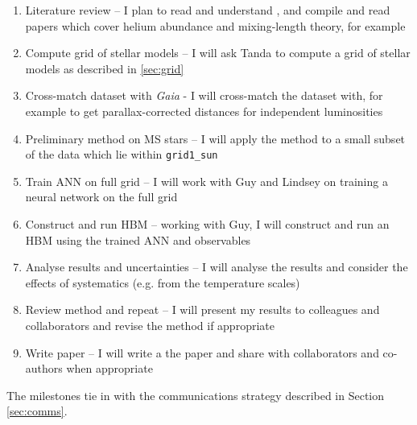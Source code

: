 \documentclass[twocolumn]{aastex63}
\begin{document}
\begin{enumerate}
    \item Literature review -- I plan to read and understand , and compile and read papers which cover helium abundance and mixing-length theory, for example
    \item Compute grid of stellar models -- I will ask Tanda to compute a grid of stellar models as described in \ref{sec:grid}
    \item Cross-match dataset with \textit{Gaia} - I will cross-match the dataset with, for example \citet{Berger.Huber.ea2018} to get parallax-corrected distances for independent luminosities
    \item Preliminary method on MS stars -- I will apply the method to a small subset of the data which lie within \texttt{grid1\_sun}
    \item Train ANN on full grid -- I will work with Guy and Lindsey on training a neural network on the full grid
    \item Construct and run HBM -- working with Guy, I will construct and run an HBM using the trained ANN and observables
    \item Analyse results and uncertainties -- I will analyse the results and consider the effects of systematics (e.g. from the temperature scales)
    \item Review method and repeat -- I will present my results to colleagues and collaborators and revise the method if appropriate
    \item Write paper -- I will write a the paper and share with collaborators and co-authors when appropriate
\end{enumerate}

The milestones tie in with the communications strategy described in Section \ref{sec:comms}.
\end{document}
